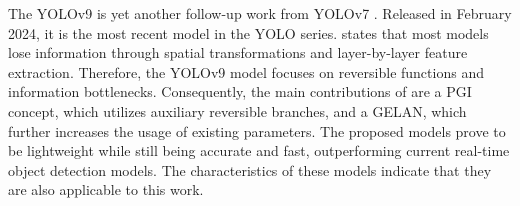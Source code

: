 The \ac{YOLO}v9 \cite{YOLOv9} is yet another follow-up work from \ac{YOLO}v7 \cite{yolov7}.
Released in February 2024, it is the most recent model in the \ac{YOLO} series.
\cite{YOLOv9} states that most models lose information through spatial transformations and layer-by-layer feature extraction.
Therefore, the \ac{YOLO}v9 model focuses on reversible functions and information bottlenecks.
Consequently, the main contributions of \cite{YOLOv9} are a \ac{PGI} concept, which utilizes auxiliary reversible branches, and a \ac{GELAN}, which further increases the usage of existing parameters.
The proposed models prove to be lightweight while still being accurate and fast, outperforming current real-time object detection models.
The characteristics of these models indicate that they are also applicable to this work.
